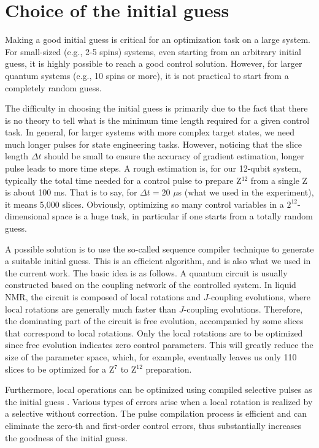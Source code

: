 \documentclass[twocolumn,reprint, amsmath,amssymb,showpacs,superscriptaddress]{revtex4-1}
\begin{document}
\section{Choice of the initial guess}

Making a good initial guess is critical for an optimization task on a large system.  For small-sized (e.g., 2-5 spins) systems, even starting from an arbitrary initial guess, it is highly possible to reach a good control solution. However, for larger quantum systems (e.g., 10 spins or more), it is not practical to start from a completely random guess.

The difficulty in choosing the initial guess is primarily due to the fact that there is no theory to tell what is the minimum time length required for a given control task. In general, for larger systems with more complex target states, we need much longer pulses for state engineering tasks. However, noticing that the slice length $\Delta t$ should be small to ensure the accuracy of gradient estimation, longer pulse leads to more time steps. A rough estimation is, for our 12-qubit system, typically the total time needed for a control pulse to prepare Z$^{12}$ from a single Z is about 100 ms. That is to say, for $\Delta t = 20$ $\mu$s (what we used in the experiment), it means 5,000 slices. Obviously, optimizing so many control variables in a $2^{12}$-dimensional space is a huge task,  in particular if one starts from a totally random guess.

A possible solution is to use the so-called sequence compiler technique \cite{ryan2008liquid} to generate a suitable initial guess. This is an efficient algorithm, and is also what we used in the current work. The basic idea is as follows.
A quantum circuit is usually constructed based on the coupling network of the controlled system. In liquid NMR, the circuit is composed of local rotations and $J$-coupling evolutions, where local rotations are generally much faster than $J$-coupling evolutions. Therefore, the dominating part of the circuit is free evolution, accompanied by some slices that correspond to local rotations. Only the local rotations are to be optimized since free evolution indicates zero control parameters. This will greatly reduce the size of the parameter space, which, for example, eventually leaves us only 110 slices to be optimized for a Z$^7$ to Z$^{12}$ preparation.

Furthermore, local operations can be optimized using compiled selective pulses as the initial guess \cite{li2016selective}. Various types of errors arise when a local rotation is realized by a selective without correction. The pulse compilation process is efficient and can eliminate the zero-th and first-order control errors, thus substantially increases the goodness of the initial guess.
\end{document}
